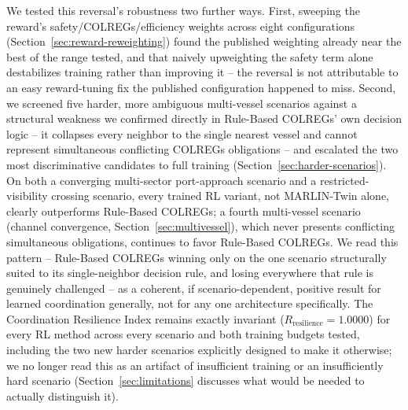 \documentclass[journal,twocolumn,10pt]{IEEEtran}
\begin{document}
We tested this reversal's robustness two further ways. First, sweeping the reward's safety/COLREGs/efficiency weights across eight configurations (Section~\ref{sec:reward-reweighting}) found the published weighting already near the best of the range tested, and that naively upweighting the safety term alone destabilizes training rather than improving it -- the reversal is not attributable to an easy reward-tuning fix the published configuration happened to miss. Second, we screened five harder, more ambiguous multi-vessel scenarios against a structural weakness we confirmed directly in Rule-Based COLREGs' own decision logic -- it collapses every neighbor to the single nearest vessel and cannot represent simultaneous conflicting COLREGs obligations -- and escalated the two most discriminative candidates to full training (Section~\ref{sec:harder-scenarios}). On both a converging multi-sector port-approach scenario and a restricted-visibility crossing scenario, every trained RL variant, not MARLIN-Twin alone, clearly outperforms Rule-Based COLREGs; a fourth multi-vessel scenario (channel convergence, Section~\ref{sec:multivessel}), which never presents conflicting simultaneous obligations, continues to favor Rule-Based COLREGs. We read this pattern -- Rule-Based COLREGs winning only on the one scenario structurally suited to its single-neighbor decision rule, and losing everywhere that rule is genuinely challenged -- as a coherent, if scenario-dependent, positive result for learned coordination generally, not for any one architecture specifically. The Coordination Resilience Index remains exactly invariant ($R_{\text{resilience}}=1.0000$) for every RL method across every scenario and both training budgets tested, including the two new harder scenarios explicitly designed to make it otherwise; we no longer read this as an artifact of insufficient training or an insufficiently hard scenario (Section~\ref{sec:limitations} discusses what would be needed to actually distinguish it).
\end{document}

